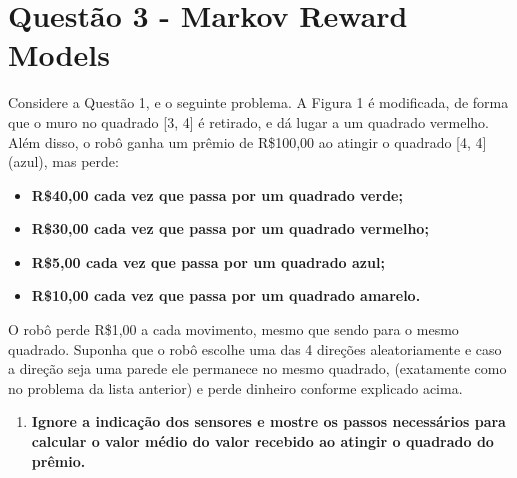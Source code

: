 \section*{Questão 3 - Markov Reward Models}

Considere a Questão 1, e o seguinte problema. A Figura 1 é modificada, de forma que o muro no quadrado [3, 4] é retirado, e dá lugar a um quadrado vermelho. Além disso, o robô ganha um prêmio de R\$100,00 ao atingir o quadrado [4, 4] (azul), mas perde:

\begin{itemize}
    \item \textbf{R\$40,00 cada vez que passa por um quadrado verde;}
    \item \textbf{R\$30,00 cada vez que passa por um quadrado vermelho;}
    \item \textbf{R\$5,00 cada vez que passa por um quadrado azul;}
    \item \textbf{R\$10,00 cada vez que passa por um quadrado amarelo.}
\end{itemize}

O robô perde R\$1,00 a cada movimento, mesmo que sendo para o mesmo quadrado. Suponha que o robô escolhe uma das 4 direções aleatoriamente e caso a direção seja uma parede ele permanece no mesmo quadrado, (exatamente como no problema da lista anterior) e perde dinheiro conforme explicado acima.

\begin{enumerate}
    \item \textbf{Ignore a indicação dos sensores e mostre os passos necessários para calcular o valor médio do valor recebido ao atingir o quadrado do prêmio.}
\end{enumerate}